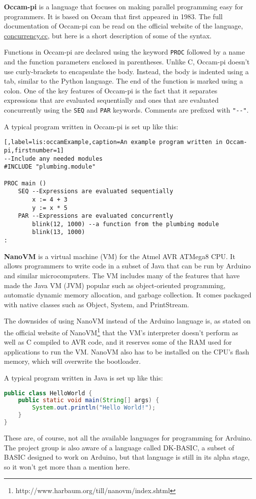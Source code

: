 \textbf{Occam-pi} is a language that focuses on making parallel programming easy for programmers.
It is based on Occam that first appeared in 1983.
The full documentation of Occam-pi can be read on the official website of the language, \url{concurrency.cc}, but here is a short description of some of the syntax.

Functions in Occam-pi are declared using the keyword \texttt{PROC} followed by a name and the function parameters enclosed in parentheses.
Unlike C, Occam-pi doesn't use curly-brackets to encapsulate the body.
Instead, the body is indented using a tab, similar to the Python language.
The end of the function is marked using a colon.
One of the key features of Occam-pi is the fact that it separates expressions that are evaluated sequentially and ones that are evaluated concurrently using the \texttt{SEQ} and \texttt{PAR} keywords.
Comments are prefixed with \texttt{"{-}{-}"}.

A typical program written in Occam-pi is set up like this:

\begin{lstlisting}[,label=lis:occamExample,caption=An example program written in Occam-pi,firstnumber=1]
--Include any needed modules
#INCLUDE "plumbing.module"

PROC main ()
	SEQ --Expressions are evaluated sequentially
		x := 4 + 3
		y := x * 5
	PAR --Expressions are evaluated concurrently
		blink(12, 1000) --a function from the plumbing module
		blink(13, 1000)
:
\end{lstlisting}

\textbf{NanoVM} is a virtual machine (VM) for the Atmel AVR ATMega8 CPU.
It allows programmers to write code in a subset of Java that can be run by Arduino and similar microcomputers.
The VM includes many of the features that have made the Java VM (JVM) popular such as object-oriented programming, automatic dynamic memory allocation, and garbage collection.
It comes packaged with native classes such as Object, System, and PrintStream.

The downsides of using NanoVM instead of the Arduino language is, as stated on the official website of NanoVM\footnote{http://www.harbaum.org/till/nanovm/index.shtml} that the VM's interpreter doesn't perform as well as C compiled to AVR code, and it reserves some of the RAM used for applications to run the VM.
NanoVM also has to be installed on the CPU's flash memory, which will overwrite the bootloader.

A typical program written in Java is set up like this:
\begin{lstlisting}[language=Java,label=lis:javaExample,caption=An example program written in Java,firstnumber=1]
public class HelloWorld {
	public static void main(String[] args) {
		System.out.println("Hello World!");
	}
}
\end{lstlisting}

These are, of course, not all the available languages for programming for Arduino.
The project group is also aware of a language called DK-BASIC, a subset of BASIC designed to work on Arduino, but that language is still in its alpha stage, so it won't get more than a mention here.
